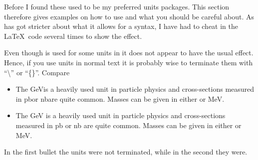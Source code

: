 Before I found  these used to be my preferred units
packages.
This section therefore gives examples on how to use 
and what you should be careful about. As  has got
stricter about what it allows for a syntax, I have had to cheat in the
\LaTeX\ code several times to show the effect.

Even though  is used for some units in 
it does not appear to have the usual effect.
Hence, if you use units in normal text it is probably wise to
terminate them with \enquote{\textbackslash } or \enquote{\{\}}. Compare
\begin{itemize}
\item The \si{\GeV}is a
  heavily used unit in particle physics and cross-sections measured in
  \si{\pico\barn}or \si{\nano\barn}are quite common.
  Masses can be given in either \si{\MeVovercsq}or \si{\MeV}.
\item The \si{\GeV} is a
  heavily used unit in particle physics and cross-sections measured in
  \si{\pico\barn} or \si{\nano\barn} are quite common.
  Masses can be given in either \si{\MeVovercsq} or \si{\MeV}.
\end{itemize}
In the first bullet the units were not terminated, while in the second
they were.

